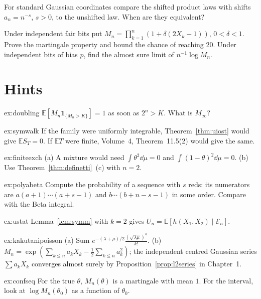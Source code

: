 \begin{exercise}[$\star\star$]\label{ex:v11-ch09-shifts}
For standard Gaussian coordinates compare the shifted product laws with shifts $a_n=n^{-s}$, $s>0$, to the unshifted law. When are they equivalent?
\end{exercise}

\begin{exercise}[$\star\star$]\label{ex:v11-ch09-bet}
Under independent fair bits put $M_n=\prod_{k=1}^n(1+\delta(2X_k-1))$, $0<\delta<1$. Prove the martingale property and bound the chance of reaching $20$. Under independent bits of bias $p$, find the almost sure limit of $n^{-1}\log M_n$.
\end{exercise}

\section{Hints}

\begin{hint}{ex:doubling}
$\mathbb E[M_n\mathbf 1_{\{M_n>K\}}]=1$ as soon as $2^n>K$. What is $M_\infty$?
\end{hint}
\begin{hint}{ex:symwalk}
If the family were uniformly integrable, Theorem~\ref{thm:uiost} would give $\mathbb ES_T=0$. If $\mathbb ET$ were finite, Volume~4, Theorem~11.5(2) would give the same.
\end{hint}
\begin{hint}{ex:finiteexch}
(a) A mixture would need $\int\theta^2\dd\mu=0$ and $\int(1-\theta)^2\dd\mu=0$. (b) Use Theorem~\ref{thm:definetti}~(c) with $n=2$.
\end{hint}
\begin{hint}{ex:polyabeta}
Compute the probability of a sequence with $s$ reds: its numerators are $a(a+1)\cdots(a+s-1)$ and $b\cdots(b+n-s-1)$ in some order. Compare with the Beta integral.
\end{hint}
\begin{hint}{ex:ustat}
Lemma~\ref{lem:symm} with $k=2$ gives $U_n=\mathbb E[h(X_1,X_2)\mid\mathcal E_n]$.
\end{hint}
\begin{hint}{ex:kakutanipoisson}
(a) Sum $e^{-(\lambda+\mu)/2}\frac{(\sqrt{\lambda\mu})^k}{k!}$. (b) $M_n=\exp(\sum_{k\le n}a_kX_k-\frac12\sum_{k\le n}a_k^2)$; the independent centred Gaussian series $\sum a_kX_k$ converges almost surely by Proposition~\ref{prop:l2series} in Chapter~1.
\end{hint}
\begin{hint}{ex:confseq}
For the true $\theta$, $M_n(\theta)$ is a martingale with mean $1$. For the interval, look at $\log M_n(\theta_0)$ as a function of $\theta_0$.
\end{hint}

